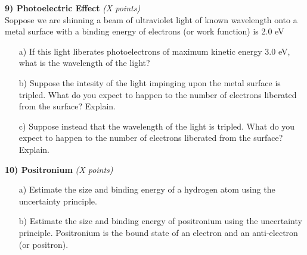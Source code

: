{\clearpage

\textbf{9) Photoelectric Effect }\hfill \textit{(X points)}\\

Soppose we are shinning a beam of ultraviolet light of known wavelength onto a metal surface with a binding energy of electrons (or work function) is 2.0 eV

\begin{itemize}
\item[a)] If this light liberates photoelectrons of maximum kinetic energy 3.0 eV, what is the wavelength of the light?
\vfill
\item[b)] Suppose the intesity of the light impinging upon the metal surface is tripled. What do you expect to happen to the number of electrons liberated from the surface? Explain.
\vfill
\item[c)] Suppose instead that the wavelength of the light is tripled. What do you expect to happen to the number of electrons liberated from the surface? Explain.
\vfill
\end{itemize}


\clearpage

\textbf{10) Positronium }\hfill \textit{(X points)}\\

\begin{itemize}
\item[a)] Estimate the size and binding energy of a hydrogen atom using the uncertainty principle. 
\vfill
\item[b)] Estimate the size and binding energy of positronium using the uncertainty principle. Positronium is the bound state of an electron and an anti-electron (or positron).
\vfill
\end{itemize}



} %

